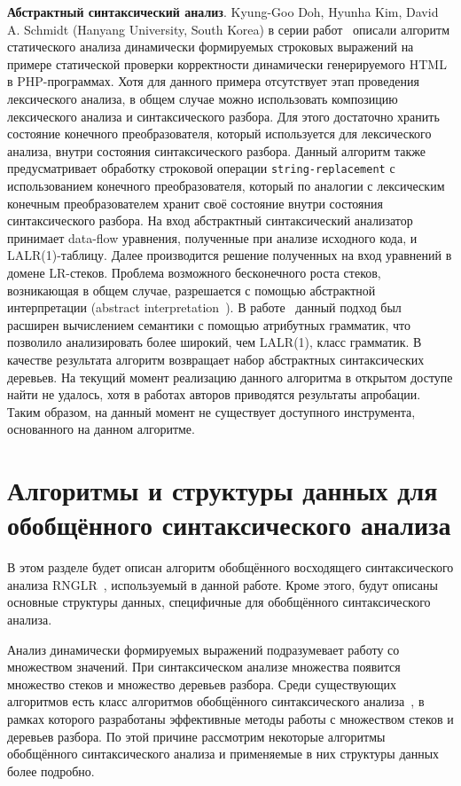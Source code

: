 \textbf{Абстрактный синтаксический анализ}. Kyung-Goo Doh,  Hyunha Kim, David A. Schmidt (Hanyang University, South Korea) в серии работ~\cite{LrAbstract1, LrAbstract2, LRAbstractParsingSema} описали алгоритм статического анализа динамически формируемых строковых выражений на примере статической проверки корректности динамически генерируемого HTML в PHP-программах. Хотя для данного примера отсутствует этап проведения лексического анализа, в общем случае можно использовать композицию лексического анализа и синтаксического разбора. Для этого достаточно хранить состояние конечного преобразователя, который используется для лексического анализа, внутри состояния синтаксического разбора. Данный алгоритм также предусматривает обработку строковой операции \verb|string-replacement| с использованием конечного преобразователя, который по аналогии с лексическим конечным преобразователем хранит своё состояние внутри состояния синтаксического разбора. На вход абстрактный синтаксический анализатор принимает data-flow  уравнения, полученные при анализе исходного кода, и  LALR(1)-таблицу. Далее производится решение полученных на вход уравнений в домене LR-стеков.  Проблема возможного бесконечного роста стеков, возникающая в общем случае, разрешается с помощью абстрактной интерпретации (abstract interpretation~\cite{AbstractInterpretation}). В работе~\cite{LRAbstractParsingSema} данный подход был расширен вычислением семантики с помощью атрибутных грамматик, что позволило анализировать более широкий, чем LALR(1), класс грамматик. В качестве результата алгоритм возвращает набор абстрактных синтаксических деревьев. На текущий момент реализацию данного алгоритма в открытом доступе найти не удалось, хотя в работах авторов приводятся результаты апробации. Таким образом, на данный момент не существует доступного инструмента, основанного на данном алгоритме.

\section{Алгоритмы и структуры данных для обобщённого синтаксического анализа}

В этом разделе будет описан алгоритм обобщённого восходящего синтаксического анализа RNGLR~\cite{RNGLR}, используемый в данной работе. Кроме этого, будут описаны основные структуры данных, специфичные для обобщённого синтаксического анализа.

Анализ динамически формируемых выражений подразумевает работу со множеством значений. При синтаксическом анализе множества появится множество стеков и множество деревьев разбора. Среди существующих алгоритмов есть класс алгоритмов обобщённого синтаксического анализа~\cite{GeneralisedlrBIG}, в рамках которого разработаны эффективные методы работы с множеством стеков и деревьев разбора. По этой причине рассмотрим некоторые алгоритмы обобщённого синтаксического анализа и применяемые в них структуры данных более подробно.

